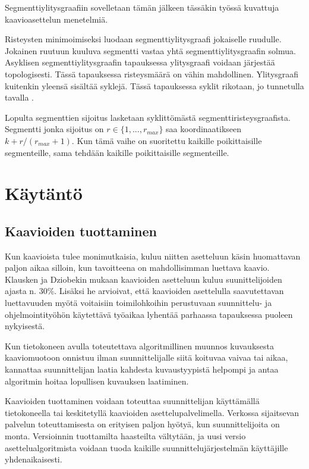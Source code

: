 \documentclass[finnish,12pt]{article}
\begin{document}
Segmenttiylitysgraafiin sovelletaan tämän jälkeen tässäkin työssä kuvattuja kaavioasettelun menetelmiä.

Risteysten minimoimiseksi luodaan segmenttiylitysgraafi jokaiselle ruudulle.
Jokainen ruutuun kuuluva segmentti vastaa yhtä segmenttiylitysgraafin solmua.
Asyklisen segmenttiylitysgraafin tapauksessa ylitysgraafi voidaan järjestää topologisesti.
Tässä tapauksessa risteysmäärä on vähin mahdollinen.
Ylitysgraafi kuitenkin yleensä sisältää syklejä. Tässä tapauksessa syklit rikotaan, jo tunnetulla tavalla \cite{RefWorks:48}.

Lopulta segmenttien sijoitus lasketaan syklittömästä segmenttiristeysgraafista.
Segmentti jonka sijoitus on $r \in \{1,...,r_{max}\}$ saa koordinaatikseen $k + r/(r_{max} +1)$.
Kun tämä vaihe on suoritettu kaikille poikittaisille segmenteille, sama tehdään kaikille poikittaisille segmenteille.

	\clearpage
	\section{Käytäntö}
	
		\subsection{Kaavioiden tuottaminen}

Kun kaavioista tulee monimutkaisia, kuluu niitten asetteluun käsin huomattavan paljon aikaa silloin, kun tavoitteena on mahdollisimman luettava kaavio.
Klausken ja Dziobekin mukaan kaavioiden asetteluun kuluu suunittelijoiden ajasta n. 30\%.
Lisäksi he arvioivat, että kaavioiden asettelulla saavutettavan luettavuuden myötä voitaisiin toimilohkoihin perustuvaan suunnittelu- ja ohjelmointityöhön käytettävä työaikaa lyhentää parhaassa tapauksessa puoleen nykyisestä. \cite{Refworks:63}

Kun tietokoneen avulla toteutettava algoritmillinen muunnos kuvauksesta kaaviomuotoon onnistuu ilman suunnittelijalle siitä koituvaa vaivaa tai aikaa, kannattaa suunnittelijan laatia kahdesta kuvaustyypistä helpompi ja antaa algoritmin hoitaa lopullisen kuvauksen laatiminen.

Kaavioiden tuottaminen voidaan toteuttaa suunnittelijan käyttämällä tietokoneella tai keskitetyllä kaavioiden asettelupalvelimella.
Verkossa sijaitsevan palvelun toteuttamisesta on erityisen paljon hyötyä, kun suunnittelijoita on monta.
Versioinnin tuottamilta haasteilta vältytään, ja uusi versio asettelualgoritmista voidaan tuoda kaikille suunnittelujärjestelmän käyttäjille yhdenaikaisesti.
\end{document}
